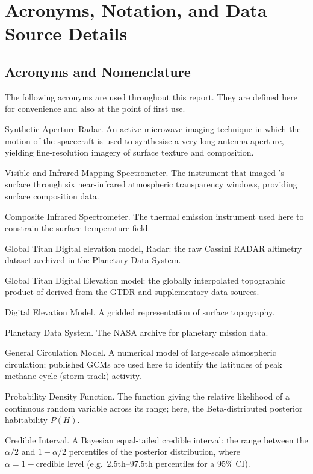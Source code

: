 \chapter{Acronyms, Notation, and Data Source Details}
\label{app:notation}


\section{Acronyms and Nomenclature}
\label{sec:acronyms}

The following acronyms are used throughout this report.  They are defined here for convenience and also at the point of
first use.

\begin{description}[labelwidth=3.0cm,leftmargin=3.5cm]
  \item[SAR]  Synthetic Aperture Radar.  An active microwave imaging technique
    in which the motion of the spacecraft is used to synthesise a very long
    antenna aperture, yielding fine-resolution imagery of surface texture and
    composition.
  \item[VIMS] Visible and Infrared Mapping Spectrometer.  The \cassini{}
    instrument that imaged \titan{}'s surface through six near-infrared
    atmospheric transparency windows, providing surface composition data.
  \item[CIRS] Composite Infrared Spectrometer.  The \cassini{} thermal
    emission instrument used here to constrain the surface temperature field.
  \item[GTDR] Global Titan Digital elevation model, Radar: the raw
    Cassini RADAR altimetry dataset archived in the Planetary Data System.
  \item[GTDE] Global Titan Digital Elevation model: the globally
    interpolated topographic product of \citet{Corlies2017Titan} derived from
    the GTDR and supplementary data sources.
  \item[DEM]  Digital Elevation Model.  A gridded representation of surface
    topography.
  \item[PDS]  Planetary Data System.  The NASA archive for planetary mission
    data.
  \item[GCM]  General Circulation Model.  A numerical model of large-scale
    atmospheric circulation; published \titan{} GCMs are used here to identify
    the latitudes of peak methane-cycle (storm-track) activity.
  \item[PDF] Probability Density Function.  The function giving the relative
    likelihood of a continuous random variable across its range; here, the
    Beta-distributed posterior habitability $P(H)$.
  \item[CI]  Credible Interval.  A Bayesian equal-tailed credible interval:
    the range between the $\alpha/2$ and $1{-}\alpha/2$ percentiles of the
    posterior distribution, where $\alpha = 1 - \text{credible level}$
    (e.g.\ 2.5th--97.5th percentiles for a 95\% CI).
\end{description}

